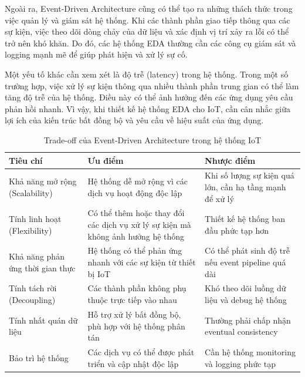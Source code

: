Ngoài ra, Event-Driven Architecture cũng có thể tạo ra những thách thức trong việc quản lý và giám sát hệ thống. Khi các thành phần giao tiếp thông qua các sự kiện, việc theo dõi dòng chảy của dữ liệu và xác định vị trí xảy ra lỗi có thể trở nên khó khăn. Do đó, các hệ thống EDA thường cần các công cụ giám sát và logging mạnh mẽ để giúp phát hiện và xử lý sự cố.

Một yếu tố khác cần xem xét là độ trễ (latency) trong hệ thống. Trong một số trường hợp, việc xử lý sự kiện thông qua nhiều thành phần trung gian có thể làm tăng độ trễ của hệ thống. Điều này có thể ảnh hưởng đến các ứng dụng yêu cầu phản hồi nhanh. Vì vậy, khi thiết kế hệ thống EDA cho IoT, cần cân nhắc giữa lợi ích của kiến trúc bất đồng bộ và yêu cầu về hiệu suất của ứng dụng.

\begin{table}[h]
\centering
\caption{Trade-off của Event-Driven Architecture trong hệ thống IoT}
\begin{tabular}{|p{3.5cm}|p{6cm}|p{5.5cm}|}
\hline
\textbf{Tiêu chí} & \textbf{Ưu điểm} & \textbf{Nhược điểm} \\ \hline

Khả năng mở rộng (Scalability) 
& Hệ thống dễ mở rộng vì các dịch vụ hoạt động độc lập 
& Khi số lượng sự kiện quá lớn, cần hạ tầng mạnh để xử lý \\ \hline

Tính linh hoạt (Flexibility) 
& Có thể thêm hoặc thay đổi các dịch vụ xử lý sự kiện mà không ảnh hưởng hệ thống 
& Thiết kế hệ thống ban đầu phức tạp hơn \\ \hline

Khả năng phản ứng thời gian thực 
& Hệ thống có thể phản ứng nhanh với các sự kiện từ thiết bị IoT 
& Có thể phát sinh độ trễ nếu event pipeline quá dài \\ \hline

Tính tách rời (Decoupling) 
& Các thành phần không phụ thuộc trực tiếp vào nhau 
& Khó theo dõi luồng dữ liệu và debug hệ thống \\ \hline

Tính nhất quán dữ liệu 
& Hỗ trợ xử lý bất đồng bộ, phù hợp với hệ thống phân tán 
& Thường phải chấp nhận eventual consistency \\ \hline

Bảo trì hệ thống 
& Các dịch vụ có thể được phát triển và cập nhật độc lập 
& Cần hệ thống monitoring và logging phức tạp \\ \hline

\end{tabular}
\label{tab:eda_tradeoff}
\end{table}

